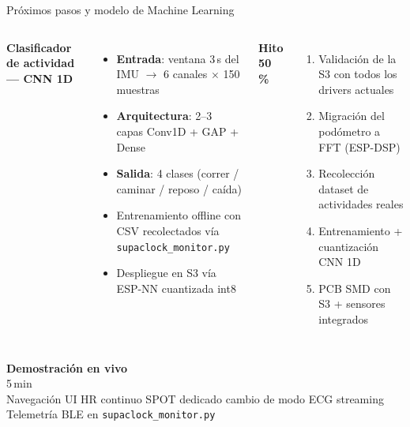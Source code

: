 \documentclass[aspectratio=169, 10pt]{beamer}
\begin{document}
\begin{frame}{Pr\'oximos pasos y modelo de Machine Learning}
    \begin{columns}[T]
        \footnotesize
        \textbf{Clasificador de actividad — CNN 1D}
        \begin{itemize}\itemsep0pt
            \item \textbf{Entrada}: ventana 3\,s del IMU \(\rightarrow\) 6 canales \(\times\) 150 muestras
            \item \textbf{Arquitectura}: 2--3 capas Conv1D + GAP + Dense
            \item \textbf{Salida}: 4 clases (correr / caminar / reposo / ca\'ida)
            \item Entrenamiento offline con CSV recolectados v\'ia \texttt{supaclock\_monitor.py}
            \item Despliegue en S3 v\'ia ESP-NN cuantizada int8
        \end{itemize}
        \footnotesize
        \textbf{Hito 50\,\%}
        \begin{enumerate}\itemsep0pt
            \item Validaci\'on de la S3 con todos los drivers actuales
            \item Migraci\'on del pod\'ometro a FFT (ESP-DSP)
            \item Recolecci\'on dataset de actividades reales
            \item Entrenamiento + cuantizaci\'on CNN 1D
            \item PCB SMD con S3 + sensores integrados
        \end{enumerate}
    \end{columns}
\end{frame}

\begin{frame}[plain]
    \centering
    \vspace{1.5cm}
    {\Huge \color{main} \textbf{Demostraci\'on en vivo}}\\[0.6cm]
    {\Large 5\,min}\\[0.4cm]
    \footnotesize
    Navegaci\'on UI \textbar{} HR continuo \textbar{} SPOT dedicado \textbar{} cambio de modo \textbar{} ECG streaming\\
    Telemetr\'ia BLE en \texttt{supaclock\_monitor.py}
\end{frame}
\end{document}
